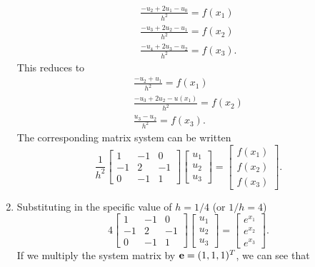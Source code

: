 \begin{enumerate}
\begin{eqnarray*}
\frac{-u_{2} + 2u_1 - u_{0}}{h^2} =  f(x_1)\\
\frac{-u_{3} + 2u_2 - u_{1}}{h^2} =  f(x_2)\\
\frac{-u_{4} + 2u_3 - u_{2}}{h^2} =  f(x_3).
\end{eqnarray*}
This reduces to
\begin{eqnarray*}
\frac{-u_{2} + u_1 }{h^2} =  f(x_1)\\
\frac{-u_{3} + 2u_2 - u(x_{1})}{h^2} =  f(x_2)\\
\frac{u_3 - u_{2}}{h^2} =  f(x_3).
\end{eqnarray*}
The corresponding matrix system can be written
\[
\frac{1}{h^2}\left[\begin{array}{ccc}
              1 & -1&0 \\
               -1 & 2 &  -1  \\
                 0 &   -1  & 1 
               \end{array}\right]
               \left[\begin{array}{c}
               u_1\\u_2\\u_3
               \end{array}\right] = 
                              \left[\begin{array}{c}
               f(x_1)\\f(x_2)\\f(x_3) 
               \end{array}\right].
\]
\item Substituting in the specific value of $h = 1/4$ (or $1/h = 4$)
\[
4\left[\begin{array}{ccc}
              1 & -1&0 \\
               -1 & 2 &  -1  \\
                 0 &   -1  & 1 
               \end{array}\right]
               \left[\begin{array}{c}
               u_1\\u_2\\u_3
               \end{array}\right] = 
                              \left[\begin{array}{c}
               e^{x_1}\\e^{x_2}\\e^{x_3}
               \end{array}\right].
\]
If we multiply the system matrix by ${\bf e} = (1,1,1)^T$, we can see that 

\end{enumerate}
